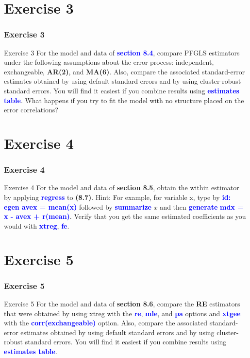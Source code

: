 \documentclass[11pt, aspectratio=169]{beamer}
\begin{document}
	\section{Exercise 3}
		\begin{frame}
			\frametitle{Exercise 3}
			\begin{block}{Exercise 3}
				For the model and data of \textcolor{blue}{\textbf{section 8.4}}, compare PFGLS estimators under
				the following assumptions about the error process: independent,
				exchangeable, \textbf{AR(2)}, and \textbf{MA(6)}. Also, compare the associated
				standard-error estimates obtained by using default standard errors and
				by using cluster-robust standard errors. You will find it easiest if you
				combine results using \textcolor{blue}{\textbf{estimates table}}. What happens if you try to fit
				the model with no structure placed on the error correlations?
			\end{block}
		\end{frame}
	\section{Exercise 4}
		\begin{frame}
			\frametitle{Exercise 4}
			\begin{block}{Exercise 4}
				 For the model and data of \textcolor{red!50}{\textbf{section 8.5}}, obtain the within estimator by
				applying \textcolor{blue}{\textbf{regress}} to \textcolor{red!50}{\textbf{(8.7)}}. Hint: For example, for variable x, type by
				\textcolor{blue}{\textbf{id: egen avex = mean(x)}} followed by \textcolor{blue}{\textbf{summarize}} $x$ and then \textcolor{blue}{\textbf{generate}}
				\textcolor{blue}{\textbf{mdx = x - avex + r(mean)}}. Verify that you get the same estimated
				coefficients as you would with \textcolor{blue}{\textbf{xtreg}}, \textcolor{blue}{\textbf{fe}}.
			\end{block}
		\end{frame}
	\section{Exercise 5}
		\begin{frame}
			\frametitle{Exercise 5}
			\begin{block}{Exercise 5}
				For the model and data of \textcolor{red!50}{\textbf{section 8.6}}, compare the \textbf{RE} estimators that
				were obtained by using xtreg with the \textcolor{blue}{\textbf{re}}, \textcolor{blue}{\textbf{mle}}, and \textcolor{blue}{\textbf{pa}} options and
				\textcolor{blue}{\textbf{xtgee}} with the \textcolor{blue}{\textbf{corr(exchangeable)}} option. Also, compare the
				associated standard-error estimates obtained by using default standard
				errors and by using cluster-robust standard errors. You will find it
				easiest if you combine results using \textcolor{blue}{\textbf{estimates table}}.
			\end{block}
		\end{frame}
\end{document}

